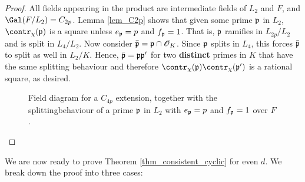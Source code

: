 \begin{proof}
    All fields appearing in the product are intermediate fields of $L_2$ and $F$, and $\Gal(F/L_2)=C_{2p}$. Lemma \ref*{lem_C2p} shows that given some prime $\mathfrak{p}$ in $L_2$, $\contr_\chi(\pp)$ is a square unless $e_{\mathfrak{p}}=p$ and $f_{\mathfrak{p}}=1$. That is, $\mathfrak{p}$ ramifies in $L_{2p}/L_2$ and is split in $L_4/L_2$. Now consider $\bar{\mathfrak{p}}=\mathfrak{p}\cap\mathcal{O}_K$. Since $\mathfrak{p}$ splits in $L_4$, this forces $\bar{\mathfrak{p}}$ to split as well in $L_2/K$. Hence, $\bar{\mathfrak{p}}=\mathfrak{p}\mathfrak{p}'$ for two \textbf{distinct} primes in $K$ that have the same splitting behaviour and therefore $\contr_\chi(\pp)\contr_\chi(\pp')$ is a rational square, as desired.

    \begin{figure}[!ht]
        \centering
        \caption[short]{\centering Field diagram for a $C_{4p}$ extension, together with the splitting\newline behaviour of a prime $\mathfrak{p}$ in $L_2$ with $e_{\mathfrak{p}}=p$ and $f_{\mathfrak{p}}=1$ over $F$.}
    \end{figure}
\end{proof}

We are now ready to prove Theorem \ref*{thm_consistent_cyclic} for even $d$. We break down the proof into three cases:

